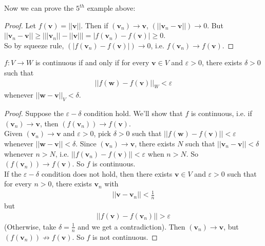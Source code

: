 \documentclass[a4paper]{article}
\begin{document}
Now we can prove the $5^{th}$ example above:
\begin{proof}
Let $f\left(\mathbf{v}\right) = ||\mathbf{v}||$. Then if $\left(\mathbf{v}_n\right) \to \mathbf{v}$, $\left(||\mathbf{v}_n - \mathbf{v}||\right) \to 0$. But $||\mathbf{v}_n-\mathbf{v}|| \geq \left| ||\mathbf{v}_n|| - ||\mathbf{v}|| \right| = |f\left(\mathbf{v}_n\right) - f\left(\mathbf{v}\right)| \geq 0$.\\
So by squeeze rule, $\left(|f\left(\mathbf{v}_n\right) - f\left(\mathbf{v}\right) | \right) \to 0$, i.e. $f\left(\mathbf{v}_n\right) \to f\left(\mathbf{v}\right)$.
\end{proof}

\begin{prop}
$f:V \to W$ is continuous if and only if for every $\mathbf{v}\in V$ and $\varepsilon > 0$, there exists $\delta > 0$ such that
\begin{equation*}
\begin{aligned}
||f\left(\mathbf{w}\right) - f\left(\mathbf{v}\right) ||_W < \varepsilon
\end{aligned}
\end{equation*}
whenever $||\mathbf{w}-\mathbf{v}||_V < \delta$.
\begin{proof}
Suppose the $\varepsilon-\delta$ condition hold. We'll show that $f$ is continuous, i.e. if $\left(\mathbf{v}_n\right) \to \mathbf{v}$, then $\left(f\left(\mathbf{v}_n\right)\right) \to f\left(\mathbf{v}\right)$.\\
Given $\left(\mathbf{v}_n\right) \to \mathbf{v}$ and $\varepsilon > 0$, pick $\delta > 0$ such that $||f\left(\mathbf{w}\right) - f\left(\mathbf{v}\right) || < \varepsilon$ whenever $|| \mathbf{w}-\mathbf{v}|| < \delta$. Since $\left(\mathbf{v}_n\right) \to \mathbf{v}$, there exists $N$ such that $||\mathbf{v}_n-\mathbf{v}|| < \delta$ whenever $n>N$, i.e. $||f\left(\mathbf{v}_n\right) - f\left(\mathbf{v}\right)|| < \varepsilon$ when $n>N$. So $\left(f\left(\mathbf{v}_n\right)\right) \to f\left(\mathbf{v}\right)$. So $f$ is continuous.\\
If the $\varepsilon-\delta$ condition does not hold, then there exists $\mathbf{v}\in V$ and $\varepsilon>0$ such that for every $n>0$, there exists $\mathbf{v}_n$ with
\begin{equation*}
\begin{aligned}
||\mathbf{v}-\mathbf{v}_n|| < \frac{1}{n}
\end{aligned}
\end{equation*}
but
\begin{equation*}
\begin{aligned}
||f\left(\mathbf{v}\right) - f\left(\mathbf{v}_n\right)|| > \varepsilon
\end{aligned}
\end{equation*}
(Otherwise, take $\delta = \frac{1}{n}$ and we get a contradiction). Then $\left(\mathbf{v}_n\right) \to \mathbf{v}$, but $\left(f\left(\mathbf{v}_n\right)\right) \not \to f\left(\mathbf{v}\right)$. So $f$ is not continuous.
\end{proof}
\end{prop}
\end{document}
